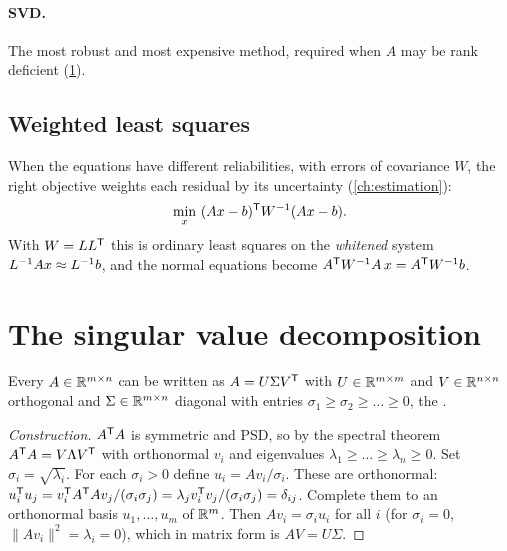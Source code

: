 \paragraph{SVD.} The most robust and most expensive method, required when $A$ may be rank deficient (\cref{sec:svd}).

\subsection{Weighted least squares}

When the equations have different reliabilities, with errors of covariance $W$, the right objective weights each residual by its
uncertainty (\cref{ch:estimation}):
\begin{equation}
  \min_x\ (Ax - b)^{\mathsf{T}} W^{-1}(Ax - b) .
\end{equation}
With $W = LL^{\mathsf{T}}$ this is ordinary least squares on the \emph{whitened} system $L^{-1} Ax \approx L^{-1} b$, and the normal equations become
$A^{\mathsf{T}} W^{-1} A\,x = A^{\mathsf{T}} W^{-1} b$.

\section{The singular value decomposition}
\label{sec:svd}

\begin{theorem}
\label{thm:svd}
Every $A \in \mathbb{R}^{m\times n}$ can be written as $A = U\Sigma V^{\mathsf{T}}$ with $U \in \mathbb{R}^{m\times m}$ and $V \in \mathbb{R}^{n\times n}$ orthogonal and
$\Sigma \in \mathbb{R}^{m\times n}$ diagonal with entries $\sigma_1 \ge \sigma_2 \ge \dots \ge 0$, the .
\end{theorem}
\begin{proof}[Construction]
$A^{\mathsf{T}} A$ is symmetric and PSD, so by the spectral theorem $A^{\mathsf{T}} A = V\Lambda V^{\mathsf{T}}$ with orthonormal $v_i$ and eigenvalues
$\lambda_1 \ge \dots \ge \lambda_n \ge 0$. Set $\sigma_i = \sqrt{\lambda_i}$. For each $\sigma_i > 0$ define $u_i = Av_i/\sigma_i$. These are
orthonormal: $u_i^{\mathsf{T}} u_j = v_i^{\mathsf{T}} A^{\mathsf{T}} Av_j/(\sigma_i\sigma_j) = \lambda_jv_i^{\mathsf{T}} v_j/(\sigma_i\sigma_j) = \delta_{ij}$. Complete them to an
orthonormal basis $u_1, \dots, u_m$ of $\mathbb{R}^m$. Then $Av_i = \sigma_iu_i$ for all $i$ (for $\sigma_i = 0$, $\|Av_i\|^2 = \lambda_i = 0$),
which in matrix form is $AV = U\Sigma$.
\end{proof}


